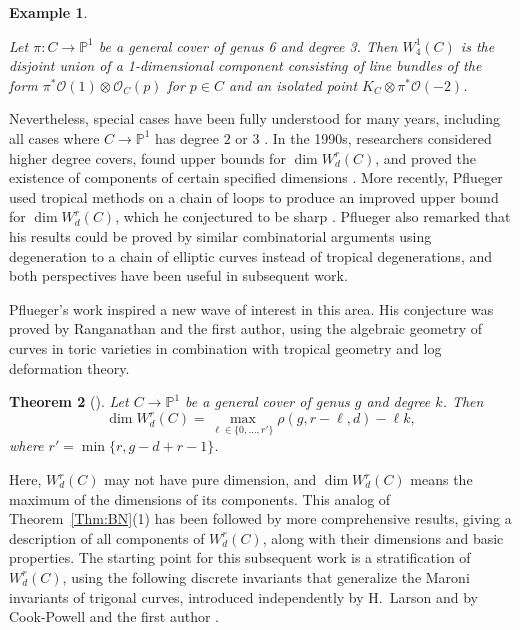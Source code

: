 \documentclass{amsart}
\newtheorem{theorem}{Theorem}[section]
\newtheorem{varexample}[theorem]{Example}
\theoremstyle{definition}
\newcommand{\PP}{\mathbb{P}}
\newcommand{\cO}{\mathcal{O}}
\newenvironment{example}{\begin{varexample}
\begin{normalfont}}{\end{normalfont}
\end{varexample}}
\begin{document}
\begin{example} \label{ex:trigonal}
Let $\pi \colon C \to \PP^1$ be a general cover of genus 6 and degree 3. Then $W^1_4 (C)$ is the disjoint union of a 1-dimensional component consisting of line bundles of the form $\pi^* \cO (1) \otimes \cO_C (p)$ for $p \in C$ and an isolated point $K_C \otimes \pi^* \cO (-2)$.
\end{example}

Nevertheless, special cases have been fully understood for many years, including all cases where $C \to \PP^1$ has degree $2$ or $3$ \cite{Clifford, Maroni}.  In the 1990s, researchers considered higher degree covers, found upper bounds for $\dim W^r_d(C)$, and proved the existence of components of certain specified dimensions \cite{Martens96, BallicoKeem96, CoppensMartens}.  More recently, Pflueger used tropical methods on a chain of loops to produce an improved upper bound for $\dim W^r_d(C)$, which he conjectured to be sharp  \cite{Pflueger17b}.  Pflueger also remarked that his results could be proved by similar combinatorial arguments using degeneration to a chain of elliptic curves instead of tropical degenerations, and both perspectives have been useful in subsequent work.

Pflueger's work inspired a new wave of interest in this area. His conjecture was proved by Ranganathan and the first author, using the algebraic geometry of curves in toric varieties in combination with tropical geometry and log deformation theory.

\begin{theorem}[\cite{JensenRanganathan}]
\label{Thm:JR}
Let $C \to \PP^1$ be a general cover of genus $g$ and degree $k$. Then
\[
\dim W^r_d (C) = \max_{\ell \in \{ 0, \ldots , r' \}} \rho (g,r-\ell,d) - \ell k ,
\]
where $r' = \min \{ r, g-d+r-1 \}$.  
\end{theorem}

\noindent Here, $W^r_d(C)$ may not have pure dimension, and $\dim W^r_d (C)$ means the maximum of the dimensions of its components.  This analog of Theorem~\ref{Thm:BN}(1) has been followed by more comprehensive results, giving a description of all components of $W^r_d(C)$, along with their dimensions and basic properties.  The starting point for this subsequent work is a stratification of $W^r_d (C)$, using the following discrete invariants that generalize the Maroni invariants of trigonal curves, introduced independently by H.~Larson \cite{Larson21} and by Cook-Powell and the first author \cite{CPJ19}. 
\end{document}
